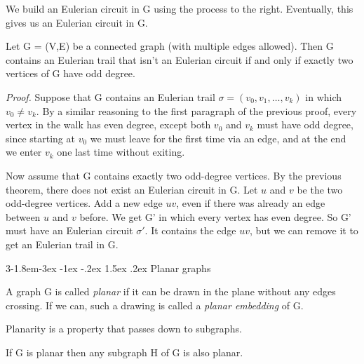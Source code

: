 \documentclass{tufte-handout}
\makeatletter
\renewcommand{\subsection}{\@startsection{subsection}%
    {3}{-1.8em}{-3ex \@plus -1ex \@minus -.2ex}%
    {1.5ex \@plus .2ex}
    {\hspace*{-5.5em}\fcolorbox{ltblue}{ltblue}{\parbox[c][1.0ex][b]{4em}{\phantom{space}}}
    \normalfont\large\itshape\color{ltblue}}}
\makeatother
\begin{document}
We build an Eulerian circuit in G using the process to the right.
Eventually, this gives us an Eulerian circuit in G. \qedsymbol

\begin{Theorem}
    Let G = (V,E) be a connected graph (with multiple edges allowed). Then G contains an Eulerian trail
    that isn't an Eulerian circuit if and only if exactly two vertices of G have odd degree.
\end{Theorem}

\textit{Proof.} Suppose that G contains an Eulerian trail \( \sigma = (v_0, v_1, \ldots, v_k) \) in which \( v_0 \neq v_k \).
By a similar reasoning to the first paragraph of the previous proof, every vertex in the walk has even degree, except both \( v_0 \) and \( v_k \)
must have odd degree, since starting at \( v_0 \) we must leave for the first time via an edge, and at the end we enter
\( v_k \) one last time without exiting.

Now assume that G contains exactly two odd-degree vertices. By the previous theorem, there does not exist an
Eulerian circuit in G. Let \( u \) and \( v \) be the two odd-degree vertices. Add a new edge \( uv \), even if there was
already an edge between \( u \) and \( v \) before. We get G' in which every vertex has even degree.
So G' must have an Eulerian circuit \( \sigma' \). It contains the edge \( uv \), but we can remove it
to get an Eulerian trail in G. \qedsymbol

\subsection{Planar graphs}

A graph G is called \textit{planar} if it can be drawn in the plane without any edges crossing.
If we can, such a drawing is called a \textit{planar embedding} of G.

Planarity is a property that passes down to subgraphs.

\begin{Proposition}
    \label{prop:planar_subgraph}
    If G is planar then any subgraph H of G is also planar.
\end{Proposition}
\end{document}
